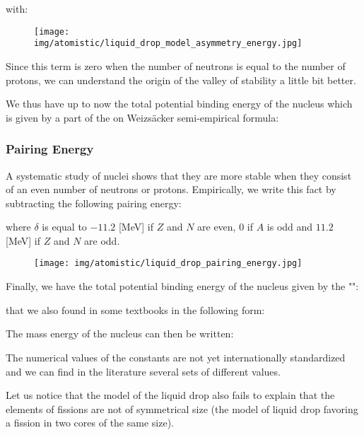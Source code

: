 	with:
	
	\begin{figure}[H]
		\centering
		\texttt{[image: img/atomistic/liquid\_drop\_model\_asymmetry\_energy.jpg]}
	\end{figure}
	Since this term is zero when the number of neutrons is equal to the number of protons, we can understand the origin of the valley of stability a little bit better.
	
	We thus have up to now the total potential binding energy of the nucleus which is given by a part of the on Weizsäcker semi-empirical formula:
	
	
	\subsubsection{Pairing Energy}
	A systematic study of nuclei shows that they are more stable when they consist of an even number of neutrons or protons. Empirically, we write this fact by subtracting the following pairing energy:
	
	where $\delta$ is equal to $-11.2$ [MeV] if $Z$ and $N$ are even, $0$ if $A$ is odd and $11.2$ [MeV] if $Z$ and $N$ are odd.
	\begin{figure}[H]
		\centering
		\texttt{[image: img/atomistic/liquid\_drop\_pairing\_energy.jpg]}
	\end{figure}
	Finally, we have the total potential binding energy of the nucleus given by the "":
	
	that we also found in some textbooks in the following form:
	
	The mass energy of the nucleus can then be written:
	
	\begin{tcolorbox}[title=Remark,colframe=black,arc=10pt]
	The numerical values of the constants are not yet internationally standardized and we can find in the literature several sets of different values.
	\end{tcolorbox}
	Let us notice that the model of the liquid drop also fails to explain that the elements of fissions are not of symmetrical size (the model of liquid drop favoring a fission in two cores of the same size).

